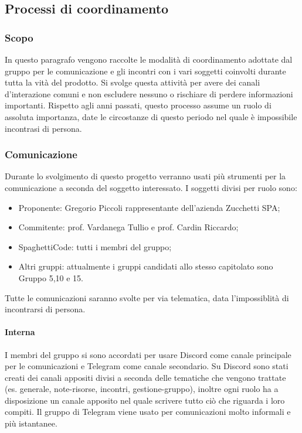 \documentclass[../norme-di-progetto.tex]{subfiles}
\begin{document}
\subsection{Processi di coordinamento}

    \subsubsection{Scopo}
    In questo paragrafo vengono raccolte le modalità di coordinamento adottate dal gruppo per le comunicazione e gli incontri  con i vari soggetti coinvolti durante tutta la vità del prodotto. Si svolge questa attività per avere dei canali d'interazione comuni e non escludere nessuno o rischiare di perdere informazioni importanti. Rispetto agli anni passati, questo processo assume un ruolo di assoluta importanza, date le circostanze di questo periodo nel quale è impossibile incontrasi di persona.

    \subsubsection{Comunicazione}
    Durante lo svolgimento di questo progetto verranno usati più strumenti per la comunicazione a seconda del soggetto interessato. I soggetti divisi per ruolo sono:
    \begin{itemize}
        \item Proponente: Gregorio Piccoli rappresentante dell'azienda Zucchetti SPA;
        \item Commitente: prof. Vardanega Tullio e prof. Cardin Riccardo;
        \item SpaghettiCode: tutti i membri del gruppo;
        \item Altri gruppi: attualmente i gruppi candidati allo stesso capitolato sono Gruppo 5,10 e 15.
    \end{itemize}
    Tutte le comunicazioni saranno svolte per via telematica, data l'impossiblità di incontrarsi di persona.
        \paragraph{Interna}
        I membri del gruppo si sono accordati per usare Discord come canale principale per le comunicazioni e Telegram come canale secondario. Su Discord sono stati creati dei canali appositi divisi a seconda delle tematiche che vengono trattate (es. generale, note-risorse, incontri, gestione-gruppo), inoltre ogni ruolo ha a disposizione un canale apposito nel quale scrivere tutto ciò che riguarda i loro compiti. Il gruppo di Telegram viene usato per comunicazioni molto informali e più istantanee.
\end{document}
